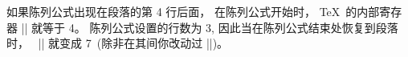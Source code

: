\ddanger 如果陈列公式出现在段落的第 4 行后面，
在陈列公式开始时， \TeX\ 的内部寄存器 |\prevgraf| 就等于 4。%
陈列公式设置的行数为 3, 因此当在陈列公式结束处恢复到段落时，
~|\prevgraf| 就变成 7~(除非在其间你改动过 |\prevgraf|)。%
